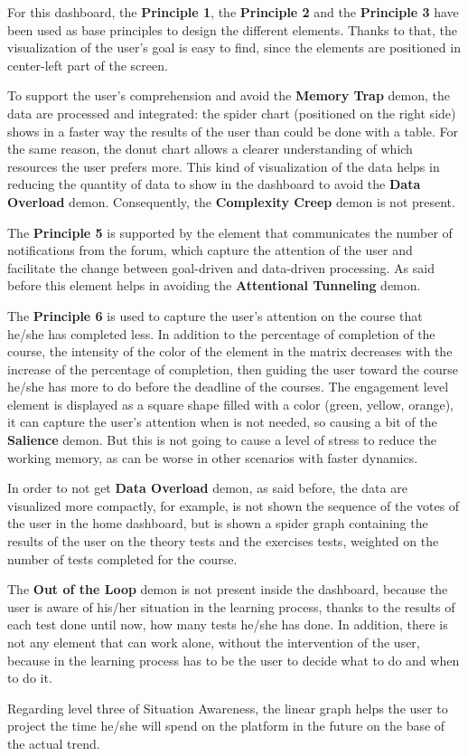 For this dashboard, the \textbf{Principle 1}, the \textbf{Principle 2} and the \textbf{Principle 3}
have been used as base principles to design the different elements. Thanks to that, the 
visualization of the user's goal is easy to find, since the elements are positioned in center-left
part of the screen. 

To support the user's comprehension and avoid the 
\textbf{Memory Trap} demon, the data are processed and integrated: the spider chart
(positioned on the right side) shows in a faster way the results of the user than
could be done with a table. For the same reason, the donut chart allows a clearer 
understanding of which resources the user prefers more. This kind of visualization of the
data helps in reducing the quantity of data to show in the dashboard to 
avoid the \textbf{Data Overload} demon. Consequently, the \textbf{Complexity Creep} demon is not present.

The \textbf{Principle 5} is supported by the element that communicates the number of 
notifications from the forum, which capture the attention of the user and
facilitate the change between goal-driven and data-driven processing. As said before
this element helps in avoiding the \textbf{Attentional Tunneling} demon.

The \textbf{Principle 6} is used to capture the user's attention on the course that
he/she has completed less. In addition to the percentage of completion of the course,
the intensity of the color of the element in the matrix decreases with the increase
of the percentage of completion, then guiding the user toward the course he/she has more to
do before the deadline of the courses. The engagement level element is displayed as a square
shape filled with a color (green, yellow, orange), it can capture the user's attention when is not needed, so 
causing a bit of the \textbf{Salience} demon. But this is not going to cause a
level of stress to reduce the working memory, as can be worse in other scenarios with 
faster dynamics.

In order to not get \textbf{Data Overload} demon, as said before, the data are visualized
more compactly, for example, is not shown the sequence of the votes of the user in
the home dashboard, but is shown a spider graph containing the results of the user on the
theory tests and the exercises tests, weighted on the number of tests completed for the course.

The \textbf{Out of the Loop} demon is not present inside the dashboard, because
the user is aware of his/her situation in the learning process, thanks to the results of each
test done until now, how many tests he/she has done. In addition, there is not any 
element that can work alone, without the intervention of the user, because in the 
learning process has to be the user to decide what to do and when to do it.

Regarding level three of
Situation Awareness, the linear graph helps the user to project the time he/she will
spend on the platform in the future on the base of the actual trend.


